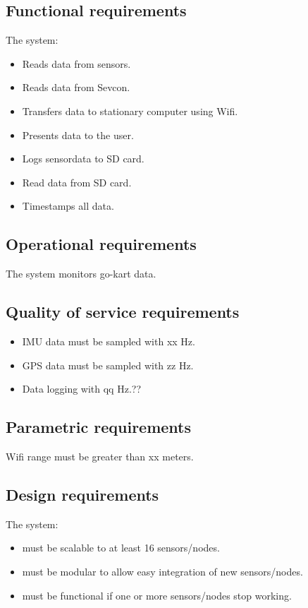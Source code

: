 \subsection{Functional requirements}
The system: 
\begin{itemize}
\item Reads data from sensors.
\item Reads data from Sevcon.
\item Transfers data to stationary computer using Wifi.
\item Presents data to the user.
\item Logs sensordata to SD card.
\item Read data from SD card.
\item Timestamps all data. 
\end{itemize}

\subsection{Operational requirements}
The system monitors go-kart data.%

\subsection{Quality of service requirements}
\begin{itemize}
\item IMU data must be sampled with xx Hz.
\item GPS data must be sampled with zz Hz.
\item Data logging with qq Hz.??
\end{itemize}

\subsection{Parametric requirements}
Wifi range must be greater than xx meters.

\subsection{Design requirements}
The system:
\begin{itemize}
\item must be scalable to at least 16 sensors/nodes.
\item must be modular to allow easy integration of new sensors/nodes.
\item must be functional if one or more sensors/nodes stop working.	 
\end{itemize}


